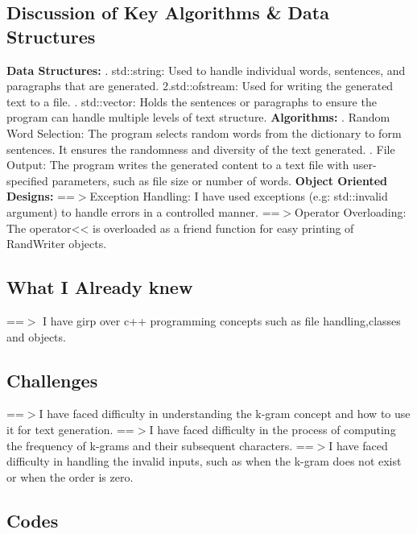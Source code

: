 \documentclass[12pt]{article}
\begin{document}
\subsection{Discussion of Key Algorithms \& Data Structures}
\textbf{Data Structures:}
. std::string: Used to handle individual words, sentences, and paragraphs that are generated.
\newline
2.std::ofstream: Used for writing the generated text to a file.
. std::vector: Holds the sentences or paragraphs to ensure the program can handle multiple levels of text structure.
\newline
\textbf{Algorithms:}
. Random Word Selection: The program selects random words from the dictionary to form sentences. It ensures the randomness and diversity of the text generated.
. File Output: The program writes the generated content to a text file with user-specified parameters, such as file size or number of words.
\newline
\textbf{Object Oriented Designs:}
\newline
==$>$Exception Handling:
\newline
I have used exceptions (e.g: std::invalid argument) to handle errors in a controlled manner.
\newline
==$>$Operator Overloading:
\newline
The operator<< is overloaded as a friend function for easy printing of RandWriter objects.
\subsection{What I Already knew}
==$>$ I have girp over c++ programming concepts such as file handling,classes and objects.
\subsection{Challenges}
==$>$I have faced difficulty in understanding the k-gram concept and how to use it for text generation.
\newline
==$>$I have faced difficulty in the process of computing the frequency of k-grams and their subsequent characters.
\newline
==$>$I have faced difficulty in handling the invalid inputs, such as when the k-gram does not exist or when the order is zero.
\subsection{Codes}
\end{document}

